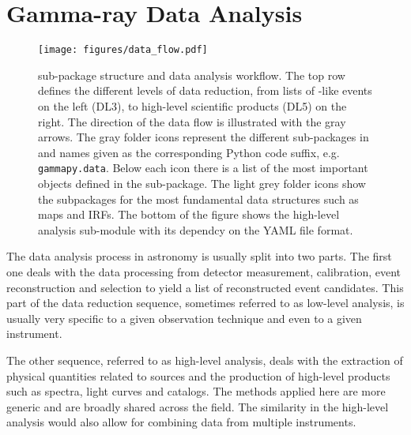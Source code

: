 \documentclass[longauth]{aa}
\newcommand{\code}[1]{\texttt{#1}}
\begin{document}
\section{Gamma-ray Data Analysis}
\begin{figure*}[t]
	\centering
	\texttt{[image: figures/data\_flow.pdf]}
	\caption{
		\gammapy sub-package structure and data analysis workflow. The top row
        defines the different levels of data reduction, from lists of \gammaray-like
        events on the left (DL3), to high-level scientific products
        (DL5) on the right. The direction of the data flow is illustrated with the
        gray arrows. The gray folder icons represent the different sub-packages
        in \gammapy and names given as the corresponding Python code suffix, e.g. 
		\code{gammapy.data}. Below each icon there is a list of the most
        important objects defined in the sub-package. The light grey folder
		icons show the subpackages for the most fundamental data structures such 
		as maps and IRFs. The bottom of the figure shows the high-level analysis
		sub-module with its dependcy on the YAML file format. 
    }
	\label{fig:data_flow}
\end{figure*}
%
\label{sec:gammaray-data-analysis}
The data analysis process in \gammaray astronomy is usually split into two parts.
The first one deals with the data processing from detector measurement, calibration, event
reconstruction and selection to yield a list of reconstructed \gammaray event candidates.
This part of the data reduction sequence, sometimes referred to as low-level analysis,
is usually very specific to a given observation technique and even to a given instrument.

The other sequence, referred to as high-level analysis, deals with the extraction of physical
quantities related to \gammaray sources and the production of high-level products such as spectra,
light curves and catalogs. The methods applied here are more generic and are broadly
shared across the field. The similarity in the high-level analysis would also allow
for combining data from multiple instruments.

\end{document}
